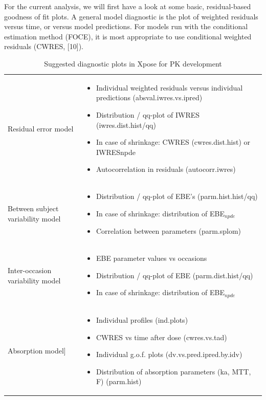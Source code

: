 For the current analysis, we will first have a look at some basic,
residual-based goodness of fit plots. A general model diagnostic is
the plot of weighted residuals versus time, or versus model
predictions. For models run with the conditional estimation method
(FOCE), it is most appropriate to use conditional weighted residuals
(CWRES, [10]). 

\begin{landscape}
\begin{table}[ht]
\caption{Suggested diagnostic plots in Xpose for PK development}
\vspace{10pt}
\footnotesize
\begin{tabular}{ p{4cm} p{12cm} }
Residual error model &
\begin{itemize}
\item Individual weighted residuals versus individual predictions (absval.iwres.vs.ipred)
\item Distribution / qq-plot of IWRES (iwres.dist.hist/qq)
\item In case of shrinkage: CWRES (cwres.dist.hist) or IWRESnpde 
\item Autocorrelation in residuals (autocorr.iwres)
\end{itemize} \\
Between subject variability model &
\begin{itemize}
\item Distribution / qq-plot of EBE’s (parm.hist.hist/qq)
\item In case of shrinkage: distribution of EBE$_{npde}$
\item Correlation between parameters (parm.splom)
\end{itemize} \\
Inter-occasion variability model &
\begin{itemize}
\item EBE parameter values vs occasions
\item Distribution / qq-plot of EBE (parm.dist.hist/qq)
\item In case of shrinkage: distribution of EBE$_{npde}$
\end{itemize} \\
Absorption model] &
\begin{itemize}
\item Individual profiles (ind.plots)
\item CWRES vs time after dose (cwres.vs.tad)
\item Individual g.o.f. plots (dv.vs.pred.ipred.by.idv)
\item Distribution of absorption parameters (ka, MTT, F) (parm.hist)
\end{itemize} \\
\end{tabular}
\end{table}
\end{landscape}

